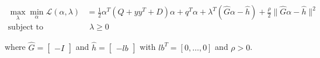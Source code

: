 \begin{equation} \label{eq:l2_svc_lb_aug_lagrangian_dual}
	\begin{aligned}
    	\max_{\lambda} \min_{\alpha} \mathcal{L}(\alpha,\lambda) &= \frac{1}{2} \alpha^T (Q + yy^T + D) \alpha + q^T \alpha + \lambda^T (\hat{G} \alpha - \hat{h}) + \frac{\rho}{2} \| \hat{G} \alpha - \hat{h} \|^2 \\
    \text{subject to} \quad & \,\, \lambda \geq 0
	\end{aligned}
\end{equation}

where $\hat{G} =
\begin{bmatrix}
-I
\end{bmatrix}$ and $\hat{h} =
\begin{bmatrix}
-lb
\end{bmatrix}$ with $lb^T = [0, \dots, 0]$ and $\rho > 0$.